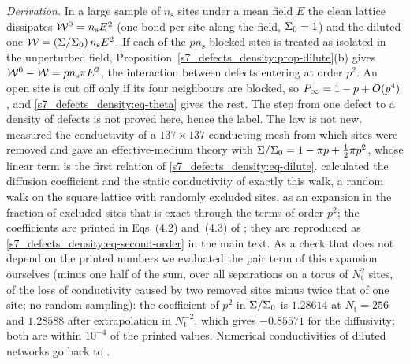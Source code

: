 \emph{Derivation.} In a large sample of $n_{\mathrm s}$ sites under a mean field $E$ the clean lattice dissipates
$\mathcal{W}^{0}=n_{\mathrm s}E^{2}$ (one bond per site along the field, $\Sigma_{0}=1$) and the diluted one
$\mathcal{W}=(\Sigma/\Sigma_{0})\,n_{\mathrm s}E^{2}$. If each of the $pn_{\mathrm s}$ blocked sites is treated as isolated in the
unperturbed field, Proposition~\ref{s7_defects_density:prop-dilute}(b) gives $\mathcal{W}^{0}-\mathcal{W}=pn_{\mathrm s}\pi E^{2}$,
the interaction between defects entering at order $p^{2}$. An open site is cut off only if its four neighbours are
blocked, so $P_{\infty}=1-p+O(p^{4})$, and \eqref{s7_defects_density:eq-theta} gives the rest. The step from one
defect to a density of defects is not proved here, hence the label. The law is not new. \citet{WatsonLeath1974}
measured the conductivity of a $137\times137$ conducting mesh from which sites were removed and gave an
effective-medium theory with $\Sigma/\Sigma_{0}=1-\pi p+\tfrac12\pi p^{2}$, whose linear term is the first relation of
\eqref{s7_defects_density:eq-dilute}. \citet{Nieuwenhuizen1986} calculated the diffusion coefficient and the
static conductivity of exactly this walk, a random walk on the square lattice with randomly excluded sites, as an
expansion in the fraction of excluded sites that is exact through the terms of order $p^{2}$; the coefficients are
printed in Eqs~(4.2) and~(4.3) of \citet{Ernst1987}; they are reproduced as \eqref{s7_defects_density:eq-second-order}
in the main text.
As a check that does not depend on the printed numbers we evaluated the pair term of this expansion ourselves
(minus one half of the sum, over all separations on a torus of $N_{\mathrm t}^{2}$ sites, of the loss of
conductivity caused by two removed sites minus twice that of one site; no random sampling): the coefficient of
$p^{2}$ in $\Sigma/\Sigma_{0}$ is $1.28614$ at $N_{\mathrm t}=256$ and $1.28588$ after extrapolation in
$N_{\mathrm t}^{-2}$, which gives $-0.85571$ for the diffusivity; both are within $10^{-4}$ of the printed values.
Numerical conductivities of diluted networks go back to \citet{Kirkpatrick1973}.

